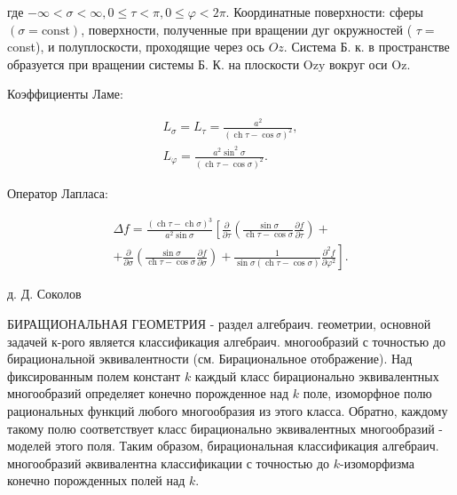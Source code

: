 \documentclass[10pt]{article}
\begin{document}
где $-\infty<\sigma<\infty, 0 \leqslant \tau<\pi, 0 \leqslant \varphi<2 \pi$. Координатные поверхности: сферы $(\sigma=\mathrm{const})$, поверхности, полученные при вращении дуг окружностей ( $\tau=$ const), и полуплоскости, проходящие через ось $O z$. Система Б. к. в пространстве образуется при вращении системы Б. К. на плоскости $\mathrm{Ozy}$ вокруг оси $\mathrm{Oz}$.



Коэффициенты Ламе:



\[

\begin{gathered}

L_{\sigma}=L_{\tau}=\frac{a^{2}}{(\operatorname{ch} \tau-\cos \sigma)^{2}}, \\

L_{\varphi}=\frac{a^{2} \sin ^{2} \sigma}{(\operatorname{ch} \tau-\cos \sigma)^{2}} .

\end{gathered}

\]



Оператор Лапласа:



\[

\begin{gathered}

\Delta f=\frac{(\operatorname{ch} \tau-\operatorname{ch} \sigma)^{3}}{a^{2} \sin \sigma}\left[\frac{\partial}{\partial \tau}\left(\frac{\sin \sigma}{\operatorname{ch} \tau-\cos \sigma} \frac{\partial f}{\partial \tau}\right)+\right. \\

\left.+\frac{\partial}{\partial \sigma}\left(\frac{\sin \sigma}{\operatorname{ch} \tau-\cos \sigma} \frac{\partial f}{\partial \sigma}\right)+\frac{1}{\sin \sigma(\operatorname{ch} \tau-\cos \sigma)} \frac{\partial^{2} f}{\partial \varphi^{2}}\right] .

\end{gathered}

\]



д. Д. Соколов



БИРАЩИОНАЛЬНАЯ ГЕОМЕТРИЯ - раздел алгебраич. геометрии, основной задачей к-рого является классификация алгебраич. многообразий с точностью до бирациональной эквивалентности (см. Бирациональное отображение). Над фиксированным полем констант $k$ каждый класс бирационально эквивалентных многообразий определяет конечно порожденное над $k$ поле, изоморфное полю рациональных функций любого многообразия из этого класса. Обратно, каждому такому полю соответствует класс бирационально эквивалентных многообразий - моделей этого поля. Таким образом, бирациональная классификация алгебраич. многообразий әквивалентна классификации с точностью до $k$-изоморфизма конечно порожденных полей над $k$.
\end{document}
